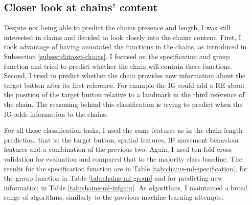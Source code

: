 \subsection{Closer look at chains' content}
Despite not being able to predict the chains presence and length, I was still interested in chains and decided to look closely into the chains content. First, I took advantage of having annotated the functions in the chains, as introduced in Subsection \ref{subsec:dataset-chains}. I focused on the specification and group function and tried to predict whether the chain will contain these functions. Second, I tried to predict whether the chain provides new information about the target button after its first reference. For example the IG could add a RE about the position of the target button relative to a landmark in the third reference of the chain. The reasoning behind this classification is trying to predict when the IG adds information to the chains.

For all these classification tasks, I used the same features as in the chain length prediction, that is: the target button, spatial features, IF movement behaviour features and a combination of the previous two. Again, I used ten-fold cross validation for evaluation and compared that to the majority class baseline. The results for the specification function are in Table \ref{tab:chains-ml-specification}, for the group function in Table \ref{tab:chains-ml-group} and for predicting new information in Table \ref{tab:chains-ml-infgain}. As algorithms, I maintained a broad range of algorithms, similarly to the previous machine learning attempts.

